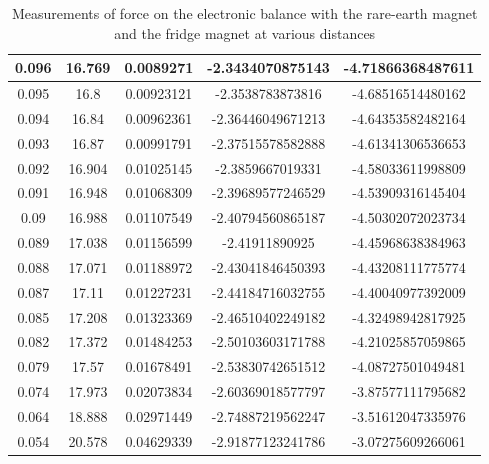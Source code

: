 \documentclass[letterpaper]{article}
\begin{document}
\begin{table}[H]
{\begin{tabular}{|c|c|c|c|c|}
   0.096          & 16.769              & 0.0089271            & -2.3434070875143   & -4.71866368487611 \\ \hline
   0.095          & 16.8                & 0.00923121           & -2.3538783873816   & -4.68516514480162 \\ \hline
   0.094          & 16.84               & 0.00962361           & -2.36446049671213  & -4.64353582482164 \\ \hline
   0.093          & 16.87               & 0.00991791           & -2.37515578582888  & -4.61341306536653 \\ \hline
   0.092          & 16.904              & 0.01025145           & -2.3859667019331   & -4.58033611998809 \\ \hline
   0.091          & 16.948              & 0.01068309           & -2.39689577246529  & -4.53909316145404 \\ \hline
   0.09           & 16.988              & 0.01107549           & -2.40794560865187  & -4.50302072023734 \\ \hline
   0.089          & 17.038              & 0.01156599           & -2.41911890925     & -4.45968638384963 \\ \hline
   0.088          & 17.071              & 0.01188972           & -2.43041846450393  & -4.43208111775774 \\ \hline
   0.087          & 17.11               & 0.01227231           & -2.44184716032755  & -4.40040977392009 \\ \hline
   0.085          & 17.208              & 0.01323369           & -2.46510402249182  & -4.32498942817925 \\ \hline
   0.082          & 17.372              & 0.01484253           & -2.50103603171788  & -4.21025857059865 \\ \hline
   0.079          & 17.57               & 0.01678491           & -2.53830742651512  & -4.08727501049481 \\ \hline
   0.074          & 17.973              & 0.02073834           & -2.60369018577797  & -3.87577111795682 \\ \hline
   0.064          & 18.888              & 0.02971449           & -2.74887219562247  & -3.51612047335976 \\ \hline
   0.054          & 20.578              & 0.04629339           & -2.91877123241786  & -3.07275609266061 \\ \hline
  \end{tabular}%
 }
 \caption{Measurements of force on the electronic balance with the rare-earth magnet and the fridge magnet at various distances}
\end{table}
\end{document}
